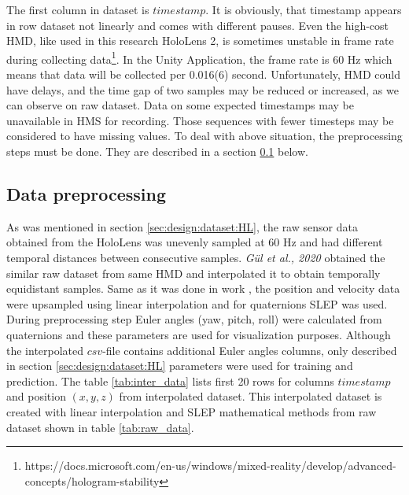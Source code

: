 The first column in dataset is $timestamp$. It is obviously, that timestamp appears in row dataset not linearly and comes with different pauses. Even the high-cost HMD, like used in this research HoloLens 2, is sometimes unstable in frame rate during collecting data\footnote{https://docs.microsoft.com/en-us/windows/mixed-reality/develop/advanced-concepts/hologram-stability}.  In the Unity Application, the frame rate is  60 Hz which means that data will be collected per 0.016(6) second. Unfortunately, HMD could have delays, and the time gap of two samples may be reduced or increased, as we can observe on raw dataset. Data on some expected timestamps may be unavailable in HMS for recording. Those sequences with fewer timesteps may be considered to have missing values. To deal with above situation, the preprocessing steps must be done. They are described in a section \ref{sec:design:dataset:preprocessing} below. 

\subsection{Data preprocessing}
\label{sec:design:dataset:preprocessing}
As was mentioned in section \ref*{sec:design:dataset:HL}, the raw sensor data obtained from the HoloLens was unevenly sampled at 60 Hz and had different temporal distances between consecutive samples. \textit{Gül et al., 2020} obtained the similar raw dataset from same HMD and interpolated it to obtain temporally equidistant samples. Same as it was done in work \cite{serhan_kalman}, the position and velocity data were upsampled using linear interpolation and for quaternions SLEP was used. During preprocessing step Euler angles (yaw, pitch, roll) were calculated from quaternions and these parameters are used for visualization purposes. Although the interpolated $csv$-file contains additional Euler angles columns, only described in section \ref{sec:design:dataset:HL} parameters were used for training and prediction. The table \ref{tab:inter_data} lists first 20 rows for columns $timestamp$ and position $(x, y, z)$ from interpolated dataset. This interpolated dataset is created with linear interpolation and SLEP mathematical methods from raw dataset shown in table \ref{tab:raw_data}. 

